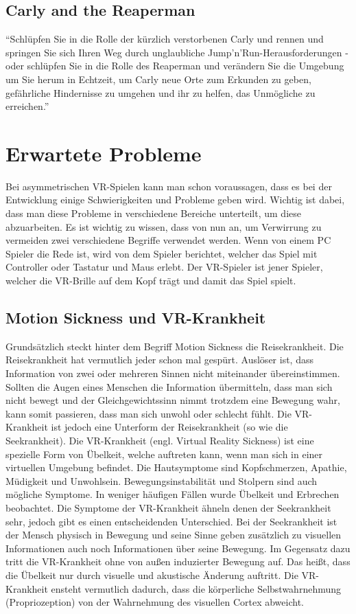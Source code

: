 \subsection{Carly and the Reaperman}
"`Schlüpfen Sie in die Rolle der kürzlich verstorbenen Carly und rennen und springen Sie sich Ihren Weg durch unglaubliche Jump'n'Run-Herausforderungen - oder schlüpfen Sie in die Rolle des Reaperman und verändern Sie die Umgebung um Sie herum in Echtzeit, um Carly neue Orte zum Erkunden zu geben, gefährliche Hindernisse zu umgehen und ihr zu helfen, das Unmögliche zu erreichen."'
\cite{_steam_carly}

\section{Erwartete Probleme}
Bei asymmetrischen VR-Spielen kann man schon voraussagen, dass es bei der Entwicklung einige Schwierigkeiten und Probleme geben wird. Wichtig ist dabei, dass man diese Probleme in verschiedene Bereiche unterteilt, um diese abzuarbeiten. Es ist wichtig zu wissen, dass von nun an, um Verwirrung zu vermeiden zwei verschiedene Begriffe verwendet werden. Wenn von einem PC Spieler die Rede ist, wird von dem Spieler berichtet, welcher das Spiel mit Controller oder Tastatur und Maus erlebt. Der VR-Spieler ist jener Spieler, welcher die VR-Brille auf dem Kopf trägt und damit das Spiel spielt. 

\subsection{Motion Sickness und VR-Krankheit} \label{simon_motionsickness}
Grundsätzlich steckt hinter dem Begriff Motion Sickness die Reisekrankheit. Die Reisekrankheit hat vermutlich jeder schon mal gespürt. Auslöser ist, dass Information von zwei oder mehreren Sinnen nicht miteinander übereinstimmen. Sollten die Augen eines Menschen die Information übermitteln, dass man sich nicht bewegt und der Gleichgewichtssinn nimmt trotzdem eine Bewegung wahr, kann somit passieren, dass man sich unwohl oder schlecht fühlt. Die VR-Krankheit ist jedoch eine Unterform der Reisekrankheit (so wie die Seekrankheit).
Die VR-Krankheit (engl. Virtual Reality Sickness) ist eine spezielle Form von Übelkeit, welche auftreten kann, wenn man sich in einer virtuellen Umgebung befindet. Die Hautsymptome sind Kopfschmerzen, Apathie, Müdigkeit und Unwohlsein. Bewegungsinstabilität und Stolpern sind auch mögliche Symptome. In weniger häufigen Fällen wurde Übelkeit und Erbrechen beobachtet. Die Symptome der VR-Krankheit ähneln denen der Seekrankheit sehr, jedoch gibt es einen entscheidenden Unterschied. Bei der Seekrankheit ist der Mensch physisch in Bewegung und seine Sinne geben zusätzlich zu visuellen Informationen auch noch Informationen über seine Bewegung. Im Gegensatz dazu tritt die VR-Krankheit ohne von außen induzierter Bewegung auf. Das heißt, dass die Übelkeit nur durch visuelle und akustische Änderung auftritt. Die VR-Krankheit ensteht vermutlich dadurch, dass die körperliche Selbstwahrnehmung (Propriozeption) von der Wahrnehmung des visuellen Cortex abweicht.

